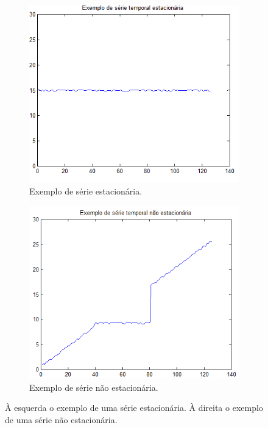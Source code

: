 \begin{figure}[ht]
\centering
\begin{subfigure}{.49\textwidth}
  \centering
  \includegraphics[width=1\linewidth]{fig/serieestacionaria.png}  
  \caption{Exemplo de série estacionária.}
  \label{fig:exestacionaria}
\end{subfigure}%
\hfill
\begin{subfigure}{.49\textwidth}
  \centering
  \includegraphics[width=1\linewidth]{fig/serienaoestacionaria.png}
  \caption{Exemplo de série não estacionária.}
  \label{fig:exnaoestacionaria}
\end{subfigure}
\caption{À esquerda o exemplo de uma série estacionária. À direita o exemplo de
uma série não estacionária.}
\label{fig:naoestacionariaeestacionaria}
\end{figure}

